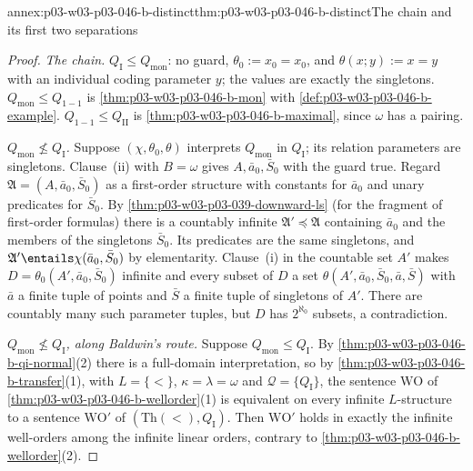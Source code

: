 \begin{annexitem}{annex:p03-w03-p03-046-b-distinct}{thm:p03-w03-p03-046-b-distinct}{The chain and its first two separations}
\begin{proof}
\emph{The chain.} \(Q_{\mathrm I}\le Q_{\mathrm{mon}}\): no guard,
\(\theta_0:=x_0=x_0\), and \(\theta(x;y):=x=y\) with an individual coding
parameter \(y\); the values are exactly the singletons. \(Q_{\mathrm{mon}}\le
Q_{1-1}\) is \cref{thm:p03-w03-p03-046-b-mon} with
\cref{def:p03-w03-p03-046-b-example}. \(Q_{1-1}\le Q_{\mathrm{II}}\) is
\cref{thm:p03-w03-p03-046-b-maximal}, since \(\omega\) has a pairing.

\emph{\(Q_{\mathrm{mon}}\not\le Q_{\mathrm I}\).} Suppose
\((\chi,\theta_0,\theta)\) interprets \(Q_{\mathrm{mon}}\) in
\(Q_{\mathrm I}\); its relation parameters are singletons. Clause~(ii) with
\(B=\omega\) gives \(A,\bar a_0,\bar S_0\) with the guard true. Regard
\(\mathfrak A=(A,\bar a_0,\bar S_0)\) as a first-order structure with
constants for \(\bar a_0\) and unary predicates for \(\bar S_0\). By
\cref{thm:p03-w03-p03-039-downward-ls} (for the fragment of first-order formulas) there is a countably infinite
\(\mathfrak A'\preccurlyeq\mathfrak A\) containing \(\bar a_0\) and the
members of the singletons \(\bar S_0\). Its predicates are the same
singletons, and \(\mathfrak A'\entails\chi(\bar a_0,\bar S_0)\) by
elementarity. Clause~(i) in the countable set \(A'\) makes
\(D=\theta_0(A',\bar a_0,\bar S_0)\) infinite and every subset of \(D\) a
set \(\theta(A',\bar a_0,\bar S_0,\bar a,\bar S)\) with \(\bar a\) a finite
tuple of points and \(\bar S\) a finite tuple of singletons of \(A'\).
There are countably many such parameter tuples, but \(D\) has \(2^{\aleph_0}\)
subsets, a contradiction.

\emph{\(Q_{\mathrm{mon}}\not\le Q_{\mathrm I}\), along Baldwin's route.}
Suppose \(Q_{\mathrm{mon}}\le Q_{\mathrm I}\). By
\cref{thm:p03-w03-p03-046-b-qi-normal}(2) there is a full-domain
interpretation, so by \cref{thm:p03-w03-p03-046-b-transfer}(1), with
\(L=\{<\}\), \(\kappa=\lambda=\omega\) and \(\mathcal Q=\{Q_{\mathrm I}\}\),
the sentence \(\mathrm{WO}\) of
\cref{thm:p03-w03-p03-046-b-wellorder}(1) is equivalent on every infinite
\(L\)-structure to a sentence \(\mathrm{WO}'\) of
\((\mathrm{Th}(<),Q_{\mathrm I})\). Then \(\mathrm{WO}'\) holds in exactly
the infinite well-orders among the infinite linear orders, contrary to
\cref{thm:p03-w03-p03-046-b-wellorder}(2).


\end{proof}
\end{annexitem}

